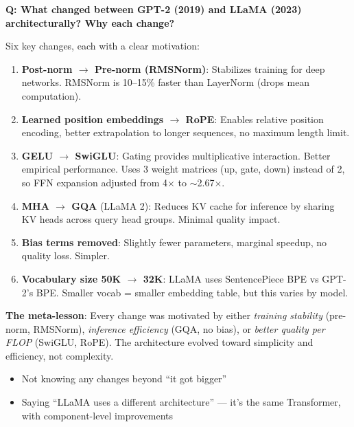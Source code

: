 \begin{interviewq}
\textbf{Q: What changed between GPT-2 (2019) and LLaMA (2023) architecturally? Why each change?}

 \quad {} \quad \badgefreq{\freqhigh}

\stronganswer

Six key changes, each with a clear motivation:

\begin{enumerate}
    \item \textbf{Post-norm $\to$ Pre-norm (RMSNorm)}: Stabilizes training for deep networks. RMSNorm is 10--15\% faster than LayerNorm (drops mean computation).
    \item \textbf{Learned position embeddings $\to$ RoPE}: Enables relative position encoding, better extrapolation to longer sequences, no maximum length limit.
    \item \textbf{GELU $\to$ SwiGLU}: Gating provides multiplicative interaction. Better empirical performance. Uses 3 weight matrices (up, gate, down) instead of 2, so FFN expansion adjusted from 4$\times$ to $\sim$2.67$\times$.
    \item \textbf{MHA $\to$ GQA} (LLaMA 2): Reduces KV cache for inference by sharing KV heads across query head groups. Minimal quality impact.
    \item \textbf{Bias terms removed}: Slightly fewer parameters, marginal speedup, no quality loss. Simpler.
    \item \textbf{Vocabulary size 50K $\to$ 32K}: LLaMA uses SentencePiece BPE vs GPT-2's BPE. Smaller vocab = smaller embedding table, but this varies by model.
\end{enumerate}

\textbf{The meta-lesson}: Every change was motivated by either \textit{training stability} (pre-norm, RMSNorm), \textit{inference efficiency} (GQA, no bias), or \textit{better quality per FLOP} (SwiGLU, RoPE). The architecture evolved toward simplicity and efficiency, not complexity.

\redflags
\begin{itemize}
    \item Not knowing any changes beyond ``it got bigger''
    \item Saying ``LLaMA uses a different architecture'' --- it's the same Transformer, with component-level improvements
\end{itemize}



\end{interviewq}
